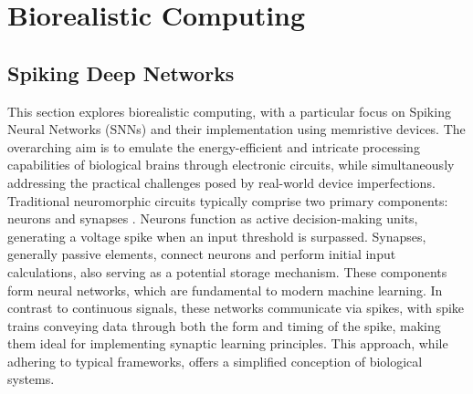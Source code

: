 
\chapter{Biorealistic Computing}

\section[Spiking Deep Networks]{Spiking Deep Networks}

This section explores biorealistic computing, with a particular focus on Spiking Neural Networks (SNNs) and their implementation using memristive devices. The overarching aim is to emulate the energy-efficient and intricate processing capabilities of biological brains through electronic circuits, while simultaneously addressing the practical challenges posed by real-world device imperfections.\\




\noindent Traditional neuromorphic circuits typically comprise two primary components: neurons and synapses \cite{mead1989analog}. Neurons function as active decision-making units, generating a voltage spike when an input threshold is surpassed. Synapses, generally passive elements, connect neurons and perform initial input calculations, also serving as a potential storage mechanism. These components form neural networks, which are fundamental to modern machine learning. In contrast to continuous signals, these networks communicate via spikes, with spike trains conveying data through both the form and timing of the spike, making them ideal for implementing synaptic learning principles. This approach, while adhering to typical frameworks, offers a simplified conception of biological systems.\\

